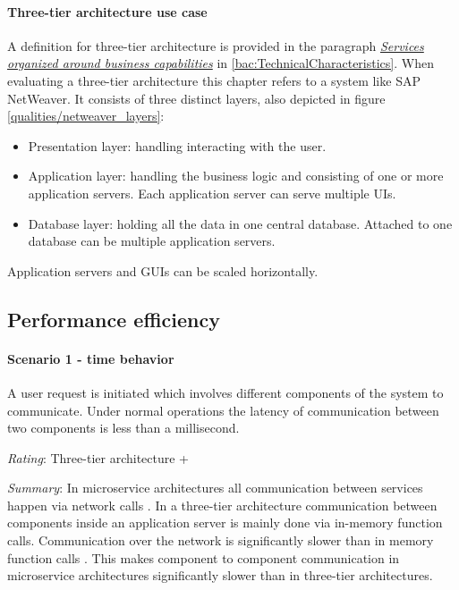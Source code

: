 \paragraph{Three-tier architecture use case}
A definition for three-tier architecture is provided in the paragraph \textit{\hyperref[bac:businessCapability]{Services organized around business capabilities}} in \ref{bac:TechnicalCharacteristics}.
When evaluating a three-tier architecture this chapter refers to a system like SAP NetWeaver. 
It consists of three distinct layers, also depicted in figure \ref{qualities/netweaver_layers}:
\begin{itemize}
\item Presentation layer: handling interacting with the user.
\item Application layer: handling the business logic and consisting of one or more application servers. Each application server can serve multiple \ac{UI}s.
\item Database layer: holding all the data in one central database. Attached to one database can be multiple application servers.
\end{itemize}
Application servers and G\acs{UI}s can be scaled horizontally.

\subsection{Performance efficiency}
\label{quaMicro:performance}
\paragraph{Scenario 1 - time behavior} A user request is initiated which involves different components of the system to communicate. Under normal operations the latency of communication between two components is less than a millisecond.
\label{quaMicro:s1}

\textit{Rating}: Three-tier architecture +

\textit{Summary}:
In microservice architectures all communication between services happen via network calls \citep[p. 3]{Newman2015}.
In a three-tier architecture communication between components inside an application server is mainly done via in-memory function calls.
Communication over the network is significantly slower than in memory function calls \citep[p. 5]{Kendall1994}.
This makes component to component communication in microservice architectures significantly slower than in three-tier architectures.


